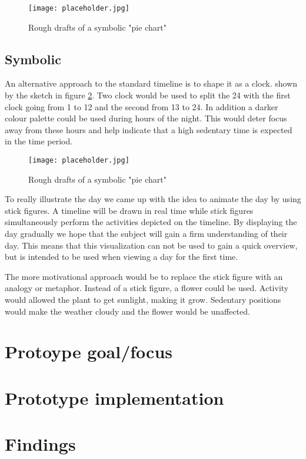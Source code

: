 \begin{figure}[h!]
	\centering
		\texttt{[image: placeholder.jpg]}
		\caption{\footnotesize Rough drafts of a symbolic "pie chart"}
		\label{fig:simpleTimeline}
\end{figure}

\subsection{Symbolic}
An alternative approach to the standard timeline is to shape it as a clock. shown by the sketch in figure \ref{fig:clock}. Two clock would be used to split the 24 with the first clock going from 1 to 12 and the second from 13 to 24. 
In addition a darker colour palette could be used during hours of the night. This would deter focus away from these hours and help indicate that a high sedentary time is expected in the time period.

\begin{figure}[h!]
	\centering
		\texttt{[image: placeholder.jpg]}
		\caption{\footnotesize Rough drafts of a symbolic "pie chart"}
		\label{fig:clock}
\end{figure}
To really illustrate the day we came up with the idea to animate the day by using stick figures. A timeline will be drawn in real time while stick figures simultaneously perform the activities depicted on the timeline. By displaying the day gradually we hope that the subject will gain a firm understanding of their day. This means that this visualization can not be used to gain a quick overview, but is intended to be used when viewing a day for the first time.

The more motivational approach would be to replace the stick figure with an analogy or metaphor. Instead of a stick figure, a flower could be used. Activity would allowed the plant to get sunlight, making it grow. Sedentary positions would make the weather cloudy and the flower would be unaffected.

\section{Protoype goal/focus}

\section{Prototype implementation}

\section{Findings}
